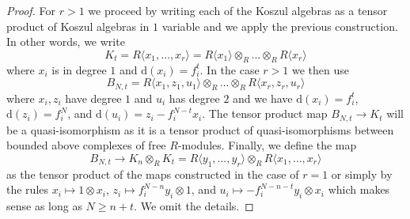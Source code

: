\begin{proof}
\medskip\noindent
For $r > 1$ we proceed by writing each of the Koszul algebras as a
tensor product of Koszul algebras in $1$ variable and we apply the
previous construction. In other words, we write
$$
K_t = R\langle x_1, \ldots, x_r\rangle =
R\langle x_1\rangle \otimes_R \ldots \otimes_R R\langle x_r\rangle
$$
where $x_i$ is in degree $1$ and $\text{d}(x_i) = f_i^t$.
In the case $r > 1$ we then use
$$
B_{N, t} =
R\langle x_1, z_1, u_1 \rangle
\otimes_R \ldots \otimes_R
R\langle x_r, z_r, u_r \rangle
$$
where $x_i, z_i$ have degree $1$ and $u_i$ has degree $2$ and we have
$\text{d}(x_i) = f_i^t$, $\text{d}(z_i) = f_i^N$, and
$\text{d}(u_i) = z_i - f_i^{N - t}x_i$.
The tensor product map $B_{N, t} \to K_t$ will be a quasi-isomorphism
as it is a tensor product of quasi-isomorphisms between bounded above
complexes of free $R$-modules. Finally, we define the map
$$
B_{N, t}
\to
K_n \otimes_R K_t =
R\langle y_1, \ldots, y_r\rangle \otimes_R
R\langle x_1, \ldots, x_r\rangle
$$
as the tensor product of the maps constructed in the case of $r = 1$
or simply by the rules $x_i \mapsto 1 \otimes x_i$,
$z_i \mapsto f_i^{N - n}y_i \otimes 1$, and
$u_i \mapsto - f_i^{N - n - t}y_i \otimes x_i$ which makes
sense as long as $N \geq n + t$. We omit the details.
\end{proof}














